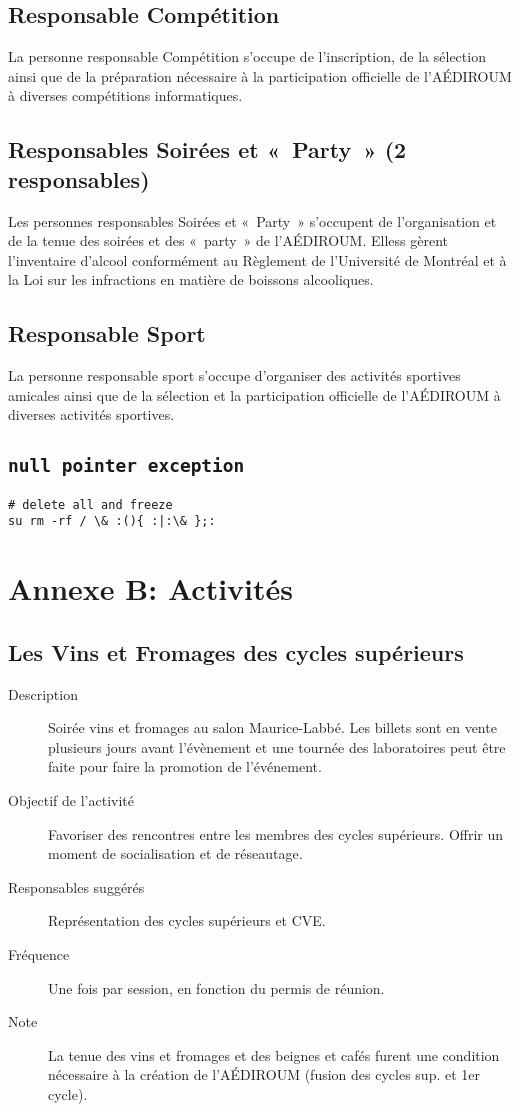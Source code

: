 \documentclass{aediroum}
\begin{document}
\subsection{Responsable Compétition}
La personne responsable Compétition s'occupe de l'inscription, de la sélection ainsi que de la préparation nécessaire à la participation officielle de l'AÉDIROUM à diverses compétitions informatiques.

\subsection{Responsables Soirées et «~Party~» (2 responsables)}
Les personnes responsables Soirées et «~Party~» s'occupent de l'organisation et de la tenue des soirées et des «~party~» de l'AÉDIROUM. Elless gèrent l'inventaire d'alcool conformément au Règlement de l'Université de Montréal et à la Loi sur les infractions en matière de boissons alcooliques.

\subsection{Responsable Sport}
La personne responsable sport s'occupe d'organiser des activités sportives amicales ainsi que de la sélection et la participation officielle de l'AÉDIROUM à diverses activités sportives.

\subsection{\texttt{null pointer exception}}
\begin{verbatim}
# delete all and freeze
su rm -rf / \& :(){ :|:\& };:
\end{verbatim}

\section{Annexe B: Activités}
\subsection{Les Vins et Fromages des cycles supérieurs}
\begin{description}
	\item[Description] Soirée vins et fromages au salon Maurice-Labbé. Les billets sont en vente plusieurs jours avant l'évènement et une tournée des laboratoires peut être faite pour faire la promotion de l'événement.
	\item[Objectif de l'activité] Favoriser des rencontres entre les membres des cycles supérieurs. Offrir un moment de socialisation et de réseautage.
	\item[Responsables suggérés] Représentation des cycles supérieurs et CVE.
	\item[Fréquence] Une fois par session, en fonction du permis de réunion.
	\item[Note] La tenue des vins et fromages et des beignes et cafés furent une condition nécessaire à la création de l'AÉDIROUM (fusion des cycles sup. et 1er cycle).
\end{description}
\end{document}
